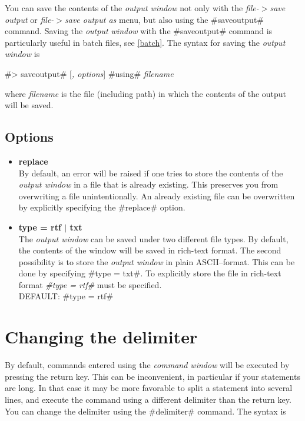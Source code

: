 You can save the contents of the {\em output window} not only with
the {\em file-$>$save output} or {\em file-$>$save output as}
menu, but also using the #saveoutput# command. Saving the {\em
output window} with the #saveoutput# command is  particularly
useful in batch files, see \autoref{batch}. The syntax for saving
the
{\em output window} is

#> saveoutput# [{\em , options}] #using# {\em filename}

where {\em filename} is the file (including path) in which the
contents of the output will be saved.


\subsection*{Options}

\begin{itemize}
\item {\bf replace} \\
By default, an error will be raised if one tries to store the
contents of the {\em output window} in a file that is already
existing. This preserves you from overwriting a file
unintentionally. An already existing file can be overwritten by
explicitly specifying the #replace# option.
\item {\bf type = rtf $|$ txt } \\
The {\em output window} can be saved under two different file
types. By default, the contents of the window will be saved in
rich-text format. The second possibility is to store the {\em
output window} in plain ASCII--format. This can be done by
specifying #type = txt#. To explicitly store the file in rich-text
format {\em #type = rtf#} must be specified. \\
DEFAULT: #type = rtf#
\end{itemize}

\section{Changing the delimiter}
\label{delimiter} 

By default, commands entered using the {\em command window} will
be executed by pressing the return key. This can be inconvenient,
in particular if your statements are long. In that case it may be
more favorable to split a statement into several lines, and
execute the command using a different delimiter than the return
key. You can change the delimiter using the #delimiter# command. The syntax is

